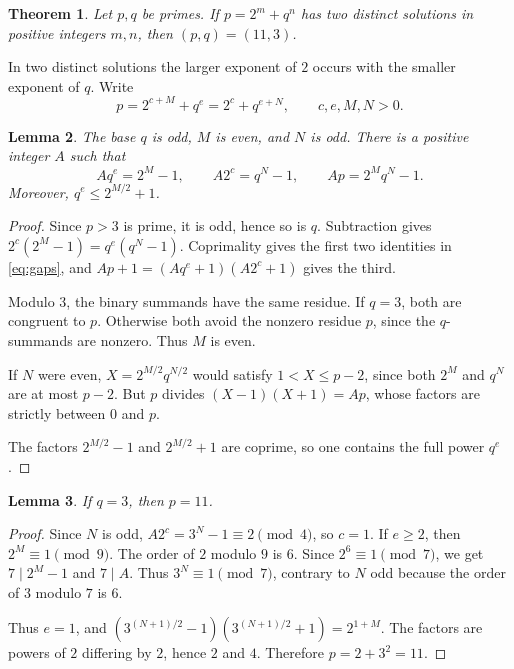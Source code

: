 \documentclass[11pt]{article}
\newtheorem{theorem}{Theorem}
\newtheorem{lemma}[theorem]{Lemma}
\begin{document}
\begin{theorem}\label{thm:classification}
Let $p,q$ be primes. If $p=2^m+q^n$ has two distinct solutions in
positive integers $m,n$, then $(p,q)=(11,3)$.
\end{theorem}

In two distinct solutions the larger exponent of $2$ occurs with the
smaller exponent of $q$. Write
\begin{equation}\label{eq:partitions}
p=2^{c+M}+q^e=2^c+q^{e+N},\qquad c,e,M,N>0.
\end{equation}

\begin{lemma}\label{lem:gaps}
The base $q$ is odd, $M$ is even, and $N$ is odd. There is a positive
integer $A$ such that
\begin{equation}\label{eq:gaps}
Aq^e=2^M-1,\qquad A2^c=q^N-1,\qquad Ap=2^Mq^N-1.
\end{equation}
Moreover, $q^e\le 2^{M/2}+1$.
\end{lemma}

\begin{proof}
Since $p>3$ is prime, it is odd, hence so is $q$. Subtraction gives
$2^c(2^M-1)=q^e(q^N-1)$. Coprimality gives the first two
identities in \eqref{eq:gaps}, and
$Ap+1=(Aq^e+1)(A2^c+1)$ gives the third.

Modulo $3$, the binary summands have the same residue. If $q=3$,
both are congruent to $p$. Otherwise both avoid the nonzero residue
$p$, since the $q$-summands are nonzero. Thus $M$ is even.

If $N$ were even, $X=2^{M/2}q^{N/2}$ would satisfy
$1<X\le p-2$, since both $2^M$ and $q^N$ are at most $p-2$.
But $p$ divides $(X-1)(X+1)=Ap$, whose factors are strictly between
$0$ and $p$.

The factors $2^{M/2}-1$ and $2^{M/2}+1$ are coprime, so one
contains the full power $q^e$.
\end{proof}

\begin{lemma}\label{lem:three}
If $q=3$, then $p=11$.
\end{lemma}

\begin{proof}
Since $N$ is odd, $A2^c=3^N-1\equiv2\pmod4$, so $c=1$.
If $e\ge2$, then $2^M\equiv1\pmod9$. The order of $2$ modulo $9$
is $6$. Since $2^6\equiv1\pmod7$, we get $7\mid2^M-1$ and $7\mid A$. Thus
$3^N\equiv1\pmod7$, contrary to $N$ odd because the order of $3$
modulo $7$ is $6$.

Thus $e=1$, and $(3^{(N+1)/2}-1)(3^{(N+1)/2}+1)=2^{1+M}$.
The factors are powers of $2$ differing by $2$, hence $2$ and $4$.
Therefore $p=2+3^2=11$.
\end{proof}
\end{document}
